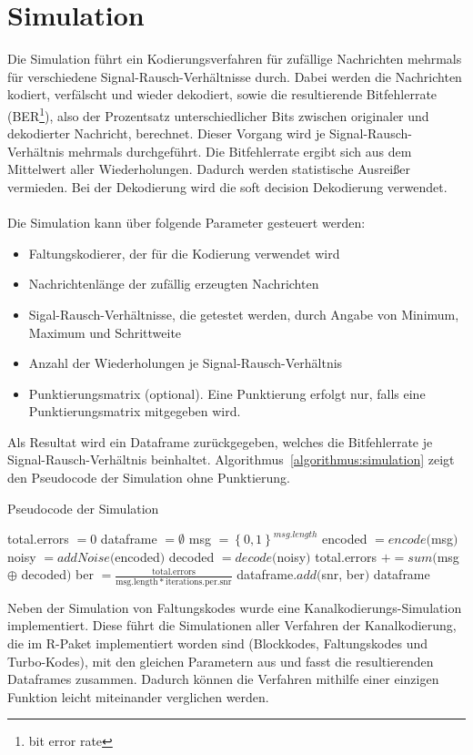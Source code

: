 \section{Simulation}
\label{kapitel:implementierung_simulation}
Die Simulation führt ein Kodierungsverfahren für zufällige Nachrichten mehrmals für verschiedene Signal-Rausch-Verhältnisse durch. Dabei werden die Nachrichten kodiert, verfälscht und wieder dekodiert, sowie die resultierende Bitfehlerrate (BER\footnote{bit error rate}), also der Prozentsatz unterschiedlicher Bits zwischen originaler und dekodierter Nachricht, berechnet. Dieser Vorgang wird je Signal-Rausch-Verhältnis mehrmals durchgeführt. Die Bitfehlerrate ergibt sich aus dem Mittelwert aller Wiederholungen. Dadurch werden statistische Ausreißer vermieden. Bei der Dekodierung wird die soft decision Dekodierung verwendet.
\\
\\
Die Simulation kann über folgende Parameter gesteuert werden:
\begin{itemize}
\item Faltungskodierer, der für die Kodierung verwendet wird
\item Nachrichtenlänge der zufällig erzeugten Nachrichten
\item Sigal-Rausch-Verhältnisse, die getestet werden, durch Angabe von Minimum, Maximum und Schrittweite
\item Anzahl der Wiederholungen je Signal-Rausch-Verhältnis
\item Punktierungsmatrix (optional). Eine Punktierung erfolgt nur, falls eine Punktierungsmatrix mitgegeben wird.
\end{itemize}
Als Resultat wird ein Dataframe zurückgegeben, welches die Bitfehlerrate je Signal-Rausch-Verhältnis beinhaltet. Algorithmus~\ref{algorithmus:simulation} zeigt den Pseudocode der Simulation ohne Punktierung.
\begin{algorithm}[H]
\renewcommand{\algorithmicforall}{\textbf{for each}}
\caption{Pseudocode der Simulation}
\label{algorithmus:simulation}
\begin{algorithmic}[1]
\STATE total.errors $=0$
\STATE dataframe $=\emptyset$
		\STATE msg $={\left\lbrace 0, 1\right\rbrace }^{\mathit{msg.length}}$
		\STATE encoded $=\mathit{encode}($msg$)$
		\STATE noisy $=\mathit{addNoise}($encoded$)$
		\STATE decoded $=\mathit{decode}($noisy$)$
		\STATE total.errors $+=\mathit{sum}($msg $\oplus$ decoded$)$
	\ENDFOR
	\STATE ber $=\frac{\mathrm{total.errors}}{\mathrm{msg.length}\ast\mathrm{iterations.per.snr}}$
	\STATE dataframe.$\mathit{add}($snr, ber$)$
\ENDFOR
\RETURN dataframe
\end{algorithmic}
\end{algorithm}
Neben der Simulation von Faltungskodes wurde eine Kanalkodierungs-Simulation implementiert. Diese führt die Simulationen aller Verfahren der Kanalkodierung, die im R-Paket implementiert worden sind  (Blockkodes, Faltungskodes und Turbo-Kodes), mit den gleichen Parametern aus und fasst die resultierenden Dataframes zusammen. Dadurch können die Verfahren mithilfe einer einzigen Funktion leicht miteinander verglichen werden.
%
